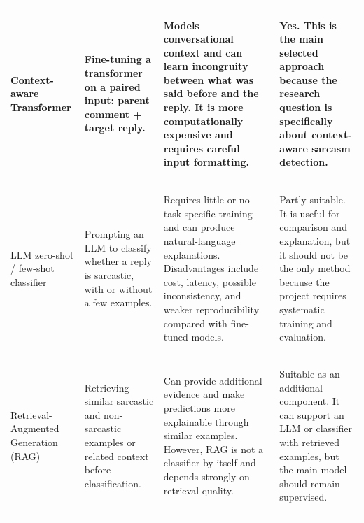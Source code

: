 \documentclass[%
 reprint,
 amsmath,amssymb,
 aps,
]{revtex4-2}
\begin{document}
\begin{table}
\begin{tabular}{| l | l | l | l |}
    \hline
        \parbox{2.2cm}{\begin{flushleft}Context-aware Transformer\end{flushleft}} &
        \parbox{3.2cm}{\begin{flushleft}Fine-tuning a transformer on a paired input: parent comment + target reply.\end{flushleft}} &
        \parbox{5.7cm}{\begin{flushleft}Models conversational context and can learn incongruity between what was said before and the reply. It is more computationally expensive and requires careful input formatting.\end{flushleft}} &
        \parbox{5.7cm}{\begin{flushleft}Yes. This is the main selected approach because the research question is specifically about context-aware sarcasm detection.\end{flushleft}} \\
    \hline
        \parbox{2.2cm}{\begin{flushleft}LLM zero-shot / few-shot classifier\end{flushleft}} &
        \parbox{3.2cm}{\begin{flushleft}Prompting an LLM to classify whether a reply is sarcastic, with or without a few examples.\end{flushleft}} &
        \parbox{5.7cm}{\begin{flushleft}Requires little or no task-specific training and can produce natural-language explanations. Disadvantages include cost, latency, possible inconsistency, and weaker reproducibility compared with fine-tuned models.\end{flushleft}} &
        \parbox{5.7cm}{\begin{flushleft}Partly suitable. It is useful for comparison and explanation, but it should not be the only method because the project requires systematic training and evaluation.\end{flushleft}} \\
    \hline
        \parbox{2.2cm}{\begin{flushleft}Retrieval-Augmented Generation (RAG)\end{flushleft}} &
        \parbox{3.2cm}{\begin{flushleft}Retrieving similar sarcastic and non-sarcastic examples or related context before classification.\end{flushleft}} &
        \parbox{5.7cm}{\begin{flushleft}Can provide additional evidence and make predictions more explainable through similar examples. However, RAG is not a classifier by itself and depends strongly on retrieval quality.\end{flushleft}} &
        \parbox{5.7cm}{\begin{flushleft}Suitable as an additional component. It can support an LLM or classifier with retrieved examples, but the main model should remain supervised.\end{flushleft}} \\
    \hline
    \end{tabular}
\end{table}
\end{document}
